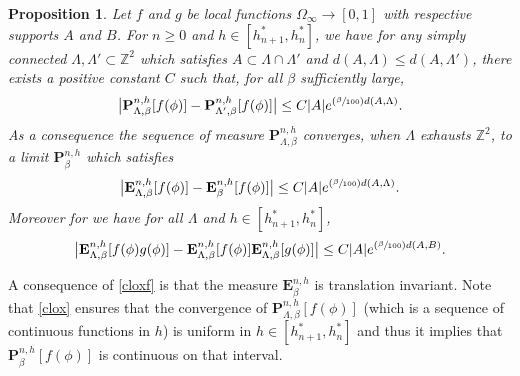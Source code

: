 \documentclass[JEP,XML,SOM,Unicode, NoFloatCountersInSection]{cedram}
\newcommand{\Psfrac}[2]{(\sfrac{#1}{#2})}
\numberwithin{equation}{section}
\theoremstyle{plain}
\newtheorem{proposition}[theorem]{Proposition}
\theoremstyle{definition}
\newcommand{\bP}{{\ensuremath{\mathbf P}} }
\newcommand{\bE}{{\ensuremath{\mathbf E}} }
\newcommand{\bbZ}{{\ensuremath{\mathbb Z}} }
\newcommand{\gb}{\beta}
\newcommand{\gO}{\Omega}
\newcommand{\gL}{\Lambda}
\begin{document}
\begin{proposition}\label{conviark}
Let $f$ and $g$ be local functions $\gO_{\infty}\to [0,1]$ with respective supports $A$ and $B$.
For $n\ge 0$ and $h\in [h^*_{n+1},h^*_n]$, we have for any simply connected $\gL,\gL'\subset \bbZ^2$ which satisfies $A\subset \gL\cap \gL'$
and $d(A,\gL)\le d(A,\gL')$, there exists a positive constant
$C$ such that, for all $\gb$ sufficiently large,
\begin{equation}\label{clox}
\bigl| \bP^{n,h}_{\gL,\gb}[f(\phi) ]-\bP^{n,h}_{\gL',\gb}[f(\phi)]\bigr|\le C|A|e^{\Psfrac{\gb}{100}d(A,\gL)}.
\end{equation}
As a consequence the sequence of measure $\bP^{n,h}_{\gL,\gb}$ converges, when $\gL$ exhausts $\bbZ^2$,
to a limit $\bP^{n,h}_{\gb}$ which satisfies
\begin{equation}\label{cloxf}
\bigl| \bE^{n,h}_{\gL,\gb}[f(\phi) ]-\bE^{n,h}_{\gb}[f(\phi)]\bigr|\le C|A|e^{\Psfrac{\gb}{100}d(A,\gL)}.
\end{equation}
Moreover for we have for all $\gL$ and $h\in [h^*_{n+1},h^*_n]$,
\begin{equation}\label{clax}
\bigl| \bE^{n,h}_{\gL,\gb}[ f(\phi)g(\phi) ]- \bE^{n,h}_{\gL,\gb}[ f(\phi)] \bE^{n,h}_{\gL,\gb}[g(\phi) ] \bigr| \le C|A|e^{\Psfrac{\gb}{100}d(A,B)}.
\end{equation}
\end{proposition}

A consequence of \eqref{cloxf} is that the measure $\bE^{n,h}_{\gb}$ is translation invariant.
Note that \eqref{clox} ensures that the convergence of $\bP^{n,h}_{\gL,\gb}[f(\phi)]$ (which is a sequence of continuous functions in $h$)
is uniform in $h\in [h^*_{n+1},h^*_n]$ and thus it implies that $\bP^{n,h}_{\gb}[f(\phi)]$ is continuous on that interval.
\end{document}
